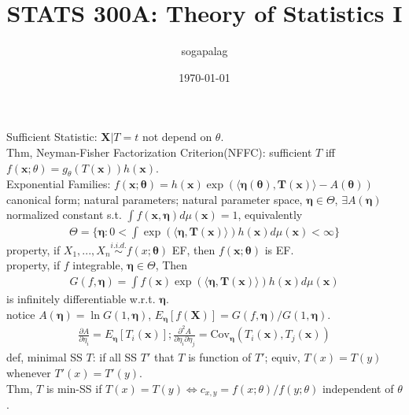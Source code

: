 \documentclass[paper=a4, fontsize=11pt]{scrartcl} %
\title{STATS 300A: Theory of Statistics I}
\author{sogapalag}
\date{\normalsize\today}
\numberwithin{equation}{section} %
\numberwithin{figure}{section} %
\numberwithin{table}{section} %
\def \cov {\text{Cov}}
\begin{document}
\maketitle
Sufficient Statistic: $\mathbf{X}|T=t$ not depend on $\theta$.\\
Thm, Neyman-Fisher Factorization Criterion(NFFC): sufficient $T$ iff $f(\mathbf{x};\theta) = g_\theta(T(\mathbf{x})) h(\mathbf{x})$.\\
Exponential Families: $f(\mathbf{x};\bm{\theta})=h(\mathbf{x})\exp(\langle\bm{\eta}(\bm{\theta}),\mathbf{T}(\mathbf{x})\rangle - A(\bm{\theta}))$\\
canonical form; natural parameters; natural parameter space, $\bm{\eta}\in \Theta$, $\exists A(\bm{\eta})$ normalized constant s.t. $\int f(\mathbf{x},\bm{\eta})d\mu(\mathbf{x})=1$, equivalently
\begin{align}
	\Theta = \{\bm{\eta}: 0<\int \exp(\langle \bm{\eta}, \mathbf{T}(\mathbf{x})\rangle)h(\mathbf{x})d\mu(\mathbf{x}) <\infty\}
\end{align}
property, if $X_1,...,X_n \stackrel{i.i.d.}{\sim} f(x;\bm{\theta})$ EF, then $f(\mathbf{x};\bm{\theta})$ is EF.\\
property, if $f$ integrable, $\bm{\eta}\in\Theta$, Then
\begin{align}
	G(f,\bm{\eta}) = \int f(\mathbf{x}) \exp(\langle \bm{\eta}, \mathbf{T}(\mathbf{x})\rangle)h(\mathbf{x})d\mu(\mathbf{x})
\end{align}
is infinitely differentiable w.r.t. $\bm{\eta}$.\\
notice $ A(\bm{\eta})=\ln G(1,\bm{\eta})$, $E_{\bm{\eta}}[f(\mathbf{X})] = G(f,\bm{\eta})/G(1,\bm{\eta})$.
\begin{align}
	\frac{\partial A}{\partial \eta_i} = E_{\bm{\eta}}[T_i(\mathbf{x})]; \frac{\partial^2 A}{\partial \eta_i \partial \eta_j} = \cov_{\bm{\eta}}(T_i(\mathbf{x}),T_j(\mathbf{x}))
\end{align}
def, minimal SS $T$: if all SS $T'$ that $T$ is  function of $T'$; equiv, $T(x)=T(y)$ whenever $T'(x)=T'(y)$.\\
Thm, $T$ is min-SS if $T(x)=T(y) \Leftrightarrow c_{x,y} = f(x;\theta)/f(y;\theta)$ independent of $\theta$.\\
\end{document}
